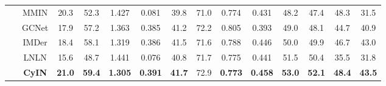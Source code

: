 \documentclass{article}
\begin{document}
\begin{table}[htbp]
{\begin{tabular}{cccccccccccccc}
        ~ & MMIN & 20.3  & 52.3  & 1.427  & 0.081  & 39.8  & 71.0  & 0.774  & 0.431  & 48.2  & 47.4  & 48.3  & 31.5 \\ 
        ~ & GCNet & 17.9  & 57.2  & 1.363  & 0.385  & 41.2  & 72.2  & 0.805  & 0.393  & 49.0  & 48.1  & 44.7  & 40.9  \\ 
        ~ & IMDer & 18.4  & 58.1  & 1.319  & 0.386  & 41.5  & 71.6  & 0.788  & 0.446  & 50.0  & 49.9  & 46.7  & 43.0 \\ 
         ~ & LNLN & 15.6  & 48.7  & 1.441  & 0.076  & 40.8  & 71.7  & 0.775  & 0.441  & 51.5  & 50.4  & 35.5  & 31.8  \\ 
    & \textbf{CyIN}  & \textbf{21.0} & \textbf{59.4} & \textbf{1.305} & \textbf{0.391} & \textbf{41.7} & 72.9 & \textbf{0.773} & \textbf{0.458} & \textbf{53.0} & \textbf{52.1} & \textbf{48.4} & \textbf{43.5} \\ 
    \bottomrule[1.5pt]
\end{tabular}
}
\end{table}
\end{document}
